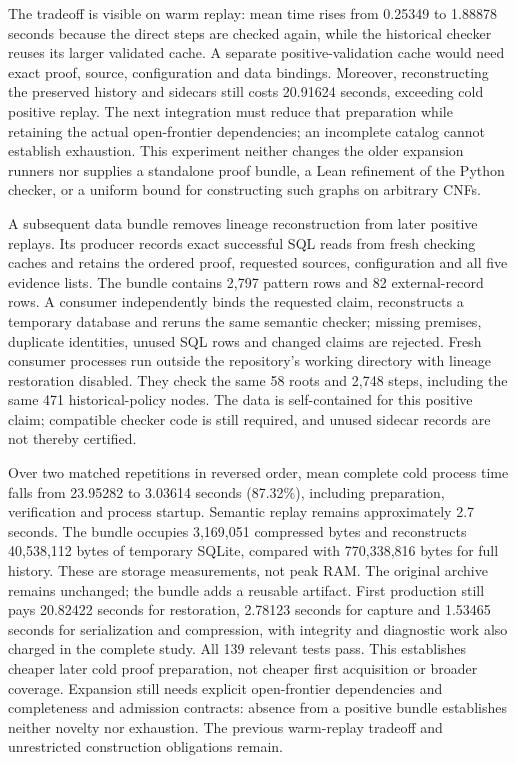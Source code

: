 \documentclass[11pt,a4paper]{article}
\numberwithin{equation}{section}
\theoremstyle{plain}
\theoremstyle{definition}
\theoremstyle{remark}
\begin{document}
The tradeoff is visible on warm replay: mean time rises from 0.25349 to 1.88878 seconds because the direct steps are checked again, while the historical checker reuses its larger validated cache. A separate positive-validation cache would need exact proof, source, configuration and data bindings. Moreover, reconstructing the preserved history and sidecars still costs 20.91624 seconds, exceeding cold positive replay. The next integration must reduce that preparation while retaining the actual open-frontier dependencies; an incomplete catalog cannot establish exhaustion. This experiment neither changes the older expansion runners nor supplies a standalone proof bundle, a Lean refinement of the Python checker, or a uniform bound for constructing such graphs on arbitrary CNFs.

A subsequent data bundle removes lineage reconstruction from later positive replays. Its producer records exact successful SQL reads from fresh checking caches and retains the ordered proof, requested sources, configuration and all five evidence lists. The bundle contains 2,797 pattern rows and 82 external-record rows. A consumer independently binds the requested claim, reconstructs a temporary database and reruns the same semantic checker; missing premises, duplicate identities, unused SQL rows and changed claims are rejected. Fresh consumer processes run outside the repository's working directory with lineage restoration disabled. They check the same 58 roots and 2,748 steps, including the same 471 historical-policy nodes. The data is self-contained for this positive claim; compatible checker code is still required, and unused sidecar records are not thereby certified.

Over two matched repetitions in reversed order, mean complete cold process time falls from 23.95282 to 3.03614 seconds (87.32\%), including preparation, verification and process startup. Semantic replay remains approximately 2.7 seconds. The bundle occupies 3,169,051 compressed bytes and reconstructs 40,538,112 bytes of temporary SQLite, compared with 770,338,816 bytes for full history. These are storage measurements, not peak RAM. The original archive remains unchanged; the bundle adds a reusable artifact. First production still pays 20.82422 seconds for restoration, 2.78123 seconds for capture and 1.53465 seconds for serialization and compression, with integrity and diagnostic work also charged in the complete study. All 139 relevant tests pass. This establishes cheaper later cold proof preparation, not cheaper first acquisition or broader coverage. Expansion still needs explicit open-frontier dependencies and completeness and admission contracts: absence from a positive bundle establishes neither novelty nor exhaustion. The previous warm-replay tradeoff and unrestricted construction obligations remain.
\end{document}
